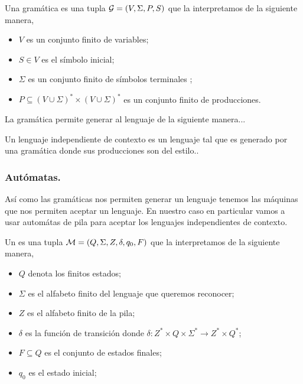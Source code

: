 \documentclass[tesis.tex]{subfiles}
\begin{document}
\begin{deff}
	Una gramática es una tupla ${\cal G} = (V, \Sigma, P, S)$ que la interpretamos de la siguiente manera,
\begin{itemize}
		\item $V$ es un conjunto finito de variables;
		\item $S \in V$ es el símbolo inicial;
		\item $\Sigma$ es un conjunto finito de símbolos terminales ;
		\item $P \subseteq (V \cup \Sigma)^* \times (V \cup \Sigma)^*$ es un conjunto finito de producciones.
\end{itemize}
\end{deff}

La gramática permite generar al lenguaje de la siguiente manera...


Un lenguaje independiente de contexto es un lenguaje tal que es generado por una gramática donde sus producciones son del estilo..

\subsubsection{Autómatas.}
Así como las gramáticas nos permiten generar un lenguaje tenemos las máquinas que nos permiten aceptar un lenguaje. En nuestro caso en particular vamos a usar automátas de pila para aceptar los lenguajes independientes de contexto.

\begin{deff}
	Un  es una tupla ${\cal M } = (Q, \Sigma, Z, \delta, q_0, F)$ que la interpretamos de la siguiente manera,
	\begin{itemize}
		\item $Q$ denota los finitos estados;
		\item $\Sigma$ es el alfabeto finito del lenguaje que queremos reconocer;
		\item $Z$ es el alfabeto finito de la pila;
		\item $\delta$ es la función de transición donde $\delta: Z^* \times Q \times \Sigma^* \to Z^* \times Q^*$;
		\item $F \subseteq Q$ es el conjunto de estados finales;
		\item $q_0$ es el estado inicial;
	\end{itemize}
\end{deff}
\end{document}
